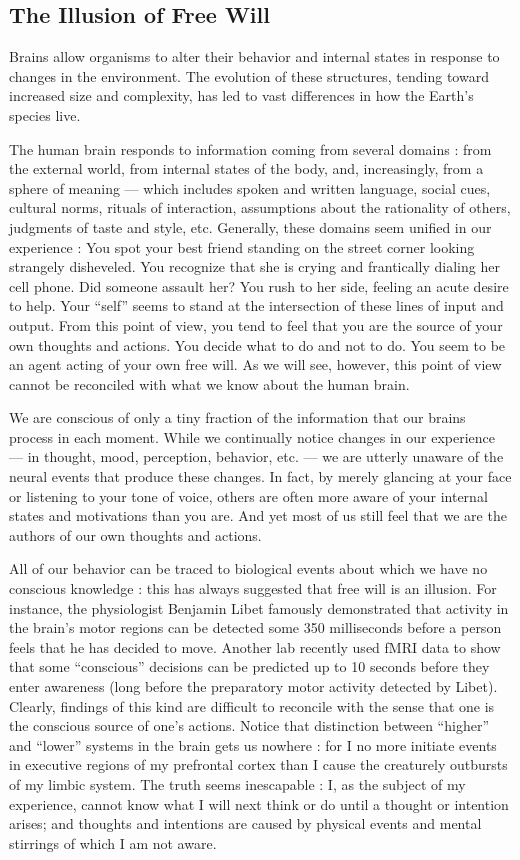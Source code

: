 \documentclass[a4paper,14pt]{extarticle}
\begin{document}
\subsection{The Illusion of Free Will}

Brains allow organisms to alter their behavior and internal states in response to changes in the environment.
The evolution of these structures, tending toward increased size and complexity, has led to vast differences in how the Earth’s species live.

The human brain responds to information coming from several domains :
from the external world, from internal states of the body, and, increasingly, from a sphere of meaning --- which includes spoken and written language, social cues, cultural norms, rituals of interaction, assumptions about the rationality of others, judgments of taste and style, etc.
Generally, these domains seem unified in our experience :
You spot your best friend standing on the street corner looking strangely disheveled.
You recognize that she is crying and frantically dialing her cell phone.
Did someone assault her?
You rush to her side, feeling an acute desire to help.
Your ``self'' seems to stand at the intersection of these lines of input and output.
From this point of view, you tend to feel that you are the source of your own thoughts and actions.
You decide what to do and not to do.
You seem to be an agent acting of your own free will.
As we will see, however, this point of view cannot be reconciled with what we know about the human brain.

We are conscious of only a tiny fraction of the information that our brains process in each moment.
While we continually notice changes in our experience --- in thought, mood, perception, behavior, etc. --- we are utterly unaware of the neural events that produce these changes.
In fact, by merely glancing at your face or listening to your tone of voice, others are often more aware of your internal states and motivations than you are.
And yet most of us still feel that we are the authors of our own thoughts and actions.

All of our behavior can be traced to biological events about which we have no conscious knowledge :
this has always suggested that free will is an illusion.
For instance, the physiologist Benjamin Libet famously demonstrated that activity in the brain’s motor regions can be detected some 350 milliseconds before a person feels that he has decided to move.
Another lab recently used fMRI data to show that some ``conscious'' decisions can be predicted up to 10 seconds before they enter awareness (long before the preparatory motor activity detected by Libet).
Clearly, findings of this kind are difficult to reconcile with the sense that one is the conscious source of one’s actions.
Notice that distinction between ``higher'' and ``lower'' systems in the brain gets us nowhere :
for I no more initiate events in executive regions of my prefrontal cortex than I cause the creaturely outbursts of my limbic system.
The truth seems inescapable :
I, as the subject of my experience, cannot know what I will next think or do until a thought or intention arises;
and thoughts and intentions are caused by physical events and mental stirrings of which I am not aware.
\end{document}
